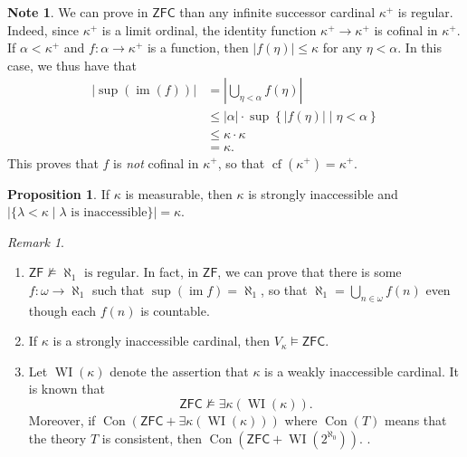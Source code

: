 \documentclass[10pt,letterpaper,cm]{nupset}
\theoremstyle{definition}
\newtheorem{note}[definition]{Note}
\theoremstyle{theorem}
\newtheorem{prop}[definition]{Proposition}
\theoremstyle{remark}
\newtheorem{remark}[definition]{Remark}
\newcommand{\1}{\mathbf{1}}
\newcommand{\0}{\vec 0}
\newcommand{\zf}{\mathsf{ZF}}
\newcommand{\zfc}{\mathsf{ZFC}}
\DeclareMathOperator{\im}{im}
\DeclareMathOperator{\cf}{cf}
\DeclareMathOperator{\wi}{WI}
\DeclareMathOperator{\con}{Con}
\begin{document}
\begin{note}
We can prove in $\zfc$ than any infinite successor cardinal $\kappa^+$ is regular. Indeed, since $\kappa^+$ is a limit ordinal, the identity function $\kappa^+ \to \kappa^+$ is cofinal in $\kappa^+$. If $\alpha < \kappa^+$ and $f : \alpha \to \kappa^+$ is a function, then $\left\lvert{f(\eta)}\right\rvert \leq \kappa$ for any $\eta < \alpha$. In this case, we thus have that
\begin{align*}
\left\lvert{\sup(\im(f))}\right\rvert & = \left\lvert{\bigcup_{\eta < \alpha}f(\eta)}\right\rvert
\\ & \leq \left\lvert{\alpha}\right\rvert \cdot \sup\left\{\left\lvert{f(\eta)}\right\rvert \mid \eta < \alpha\right\}
\\ & \leq \kappa \cdot \kappa
\\ & = \kappa
.\end{align*} This proves that  $f$ is \emph{not} cofinal in $\kappa^+$, so that $\cf(\kappa^+) = \kappa^+$.
\end{note}

\begin{prop} 
 If $\kappa$ is measurable, then $\kappa$ is strongly inaccessible and $\left\lvert{\{\lambda < \kappa \mid \lambda \text{ is inaccessible}\}}\right\rvert = \kappa$.
\end{prop}

\begin{remark} $ $
\begin{enumerate}
\item $\zf \nvDash \aleph_1 \text{ is regular}$. In fact, in $\zf$, we can prove that there is some $f: \omega \to \aleph_1$ such that $\sup(\im{f}) = \aleph_1$, so that $\aleph_1 = \bigcup_{n \in \omega} f(n)$ even though each $f(n)$ is countable. 
\item If $\kappa$ is a strongly inaccessible cardinal, then $V_{\kappa} \models \zfc$.
\item  Let $\wi(\kappa)$ denote the assertion that $\kappa$ is a weakly inaccessible cardinal. It is known that $$\zfc \nvDash \exists{\kappa}(\wi(\kappa)).$$ Moreover, if $\con(\zfc + \exists{\kappa}(\wi(\kappa)))$ where $\con(T)$ means that the theory $T$ is consistent, then $\con(\zfc + \wi(2^{\aleph_0}))$.     . 
\end{enumerate}
\end{remark}
\end{document}

